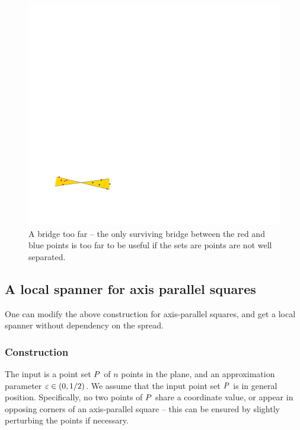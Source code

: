 \documentclass[12pt]{article}%
\begin{document}
\begin{figure}[h]
    \includegraphics[page=3]{figs/bad_example} \hfill%
    \phantom{}
    \caption{A bridge too far -- the only surviving bridge between the
       red and blue points is too far to be useful if the sets are
       points are not well separated.}
\end{figure}





\subsection{A local spanner for axis parallel squares}

One can modify the above construction for axis-parallel squares, and
get a local spanner without dependency on the spread.

\subsubsection{Construction}

The input is a point set $P$ of $n$ points in the plane, and an
approximation parameter $\varepsilon \in (0,1/2)$.  We assume that the input
point set $P$ is in general position. Specifically, no two points of
$P$ share a coordinate value, or appear in opposing corners of an
axis-parallel square -- this can be ensured by slightly perturbing the
points if necessary.
\end{document}
